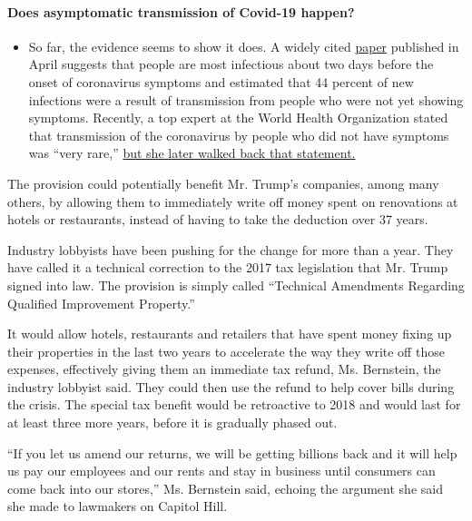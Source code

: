 \begin{itemize}
{  \paragraph{Does asymptomatic transmission of Covid-19
  happen?}\label{does-asymptomatic-transmission-of-covid-19-happen}}

  \begin{itemize}
  \tightlist
  \item
    So far, the evidence seems to show it does. A widely cited
    \href{https://www.nature.com/articles/s41591-020-0869-5}{paper}
    published in April suggests that people are most infectious about
    two days before the onset of coronavirus symptoms and estimated that
    44 percent of new infections were a result of transmission from
    people who were not yet showing symptoms. Recently, a top expert at
    the World Health Organization stated that transmission of the
    coronavirus by people who did not have symptoms was ``very rare,''
    \href{https://www.nytimes.com/2020/06/09/world/coronavirus-updates.html?action=click\&pgtype=Article\&state=default\&region=MAIN_CONTENT_3\&context=storylines_faq\#link-1f302e21}{but
    she later walked back that statement.}
  \end{itemize}
\end{itemize}

The provision could potentially benefit Mr. Trump's companies, among
many others, by allowing them to immediately write off money spent on
renovations at hotels or restaurants, instead of having to take the
deduction over 37 years.

Industry lobbyists have been pushing for the change for more than a
year. They have called it a technical correction to the 2017 tax
legislation that Mr. Trump signed into law. The provision is simply
called ``Technical Amendments Regarding Qualified Improvement
Property.''

It would allow hotels, restaurants and retailers that have spent money
fixing up their properties in the last two years to accelerate the way
they write off those expenses, effectively giving them an immediate tax
refund, Ms. Bernstein, the industry lobbyist said. They could then use
the refund to help cover bills during the crisis. The special tax
benefit would be retroactive to 2018 and would last for at least three
more years, before it is gradually phased out.

``If you let us amend our returns, we will be getting billions back and
it will help us pay our employees and our rents and stay in business
until consumers can come back into our stores,'' Ms. Bernstein said,
echoing the argument she said she made to lawmakers on Capitol Hill.

